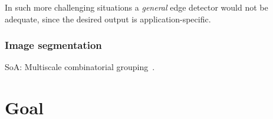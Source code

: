 In such more challenging situations a \textit{general} edge detector would not be adequate, since the desired output is application-specific.


\subsubsection{Image segmentation}

SoA: Multiscale combinatorial grouping~\cite{Arbelaez2014multiscale}.
\section{Goal}



